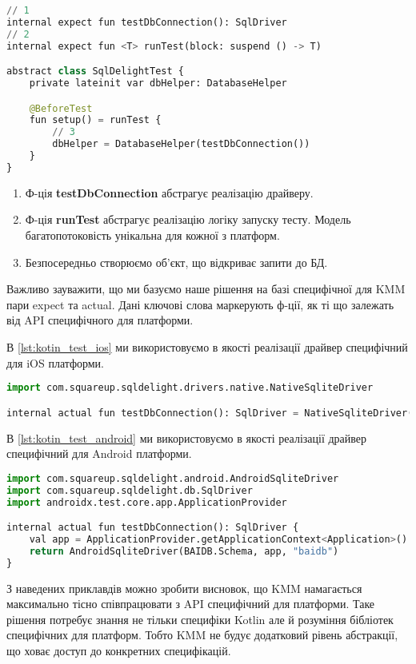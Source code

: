 \begin{lstlisting}[style=light, language=Python,label={lst:kotin_test_common},caption=Common Unit Test]
// 1
internal expect fun testDbConnection(): SqlDriver
// 2
internal expect fun <T> runTest(block: suspend () -> T)

abstract class SqlDelightTest {
    private lateinit var dbHelper: DatabaseHelper

    @BeforeTest
    fun setup() = runTest {
        // 3
        dbHelper = DatabaseHelper(testDbConnection())
    }
}
\end{lstlisting}

\begin{enumerate}
    \item Ф-ція \textbf{testDbConnection} абстрагує реалізацію драйверу.
    \item Ф-ція \textbf{runTest} абстрагує реалізацію логіку запуску тесту. Модель багатопотоковість унікальна для кожної з платформ.
    \item Безпосередньо створюємо об'єкт, що відкриває запити до БД.
\end{enumerate}

Важливо зауважити, що ми базуємо наше рішення на базі специфічної для KMM пари expect та actual.
Дані ключові слова маркерують ф-ції, як ті що залежать від API специфічного для платформи.

В \ref{lst:kotin_test_ios} ми використовуємо в якості реалізації драйвер специфічний для iOS платформи.

\begin{lstlisting}[style=light, language=Python,label={lst:kotin_test_ios},caption=iOS SQLDriver]
import com.squareup.sqldelight.drivers.native.NativeSqliteDriver

internal actual fun testDbConnection(): SqlDriver = NativeSqliteDriver(BAIDB.Schema, "baidb")
\end{lstlisting}

В \ref{lst:kotin_test_android} ми використовуємо в якості реалізації драйвер специфічний для Android платформи.

\begin{lstlisting}[style=light, language=Python,label={lst:kotin_test_android},caption=Android SQLDriver]
import com.squareup.sqldelight.android.AndroidSqliteDriver
import com.squareup.sqldelight.db.SqlDriver
import androidx.test.core.app.ApplicationProvider

internal actual fun testDbConnection(): SqlDriver {
    val app = ApplicationProvider.getApplicationContext<Application>()
    return AndroidSqliteDriver(BAIDB.Schema, app, "baidb")
}
\end{lstlisting}

З наведених приклавдів можно зробити висновок, що KMM намагається максимально тісно співпрацювати з API специфічний для платформи.
Таке рішення потребує знання не тільки специфіки Kotlin але й розуміння бібліотек специфічних для платформ.
Тобто KMM не будує додатковий рівень абстракції, що ховає доступ до конкретних специфікацій.
